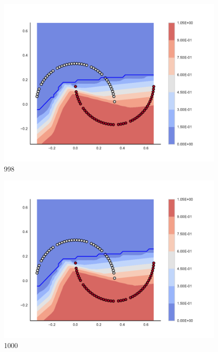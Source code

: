 \begin{subfigure}[b]{0.09\textwidth}
    \includegraphics[clip, trim=2.35cm 1.75cm 4.5cm 0cm,width=\textwidth]{img/convergence/998.pdf}
    \caption{998}
    \label{fig:convergence_998}
\end{subfigure}
%
\begin{subfigure}[b]{0.09\textwidth}
    \includegraphics[clip, trim=2.35cm 1.75cm 4.5cm 0cm,width=\textwidth]{img/convergence/1000.pdf}
    \caption{1000}
    \label{fig:convergence_1000}
\end{subfigure}
%
